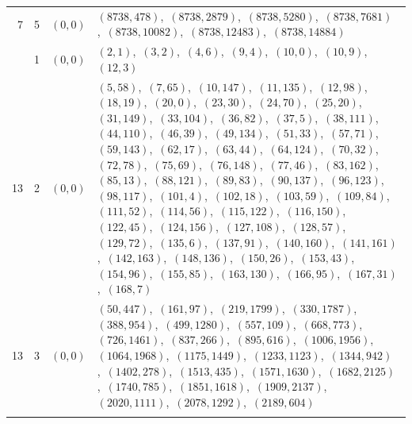\documentclass[11pt]{article}
\begin{document}
\begin{longtable}{@{}rrl>{\raggedright\arraybackslash}p{}@{}}
7 & 5 & $(0,0)$ & $(8738,478)$,\allowbreak\ $(8738,2879)$,\allowbreak\ $(8738,5280)$,\allowbreak\ $(8738,7681)$,\allowbreak\ $(8738,10082)$,\allowbreak\ $(8738,12483)$,\allowbreak\ $(8738,14884)$\\
\addlinespace[3pt]
13 & 1 & $(0,0)$ & $(2,1)$,\allowbreak\ $(3,2)$,\allowbreak\ $(4,6)$,\allowbreak\ $(9,4)$,\allowbreak\ $(10,0)$,\allowbreak\ $(10,9)$,\allowbreak\ $(12,3)$\\
13 & 2 & $(0,0)$ & $(5,58)$,\allowbreak\ $(7,65)$,\allowbreak\ $(10,147)$,\allowbreak\ $(11,135)$,\allowbreak\ $(12,98)$,\allowbreak\ $(18,19)$,\allowbreak\ $(20,0)$,\allowbreak\ $(23,30)$,\allowbreak\ $(24,70)$,\allowbreak\ $(25,20)$,\allowbreak\ $(31,149)$,\allowbreak\ $(33,104)$,\allowbreak\ $(36,82)$,\allowbreak\ $(37,5)$,\allowbreak\ $(38,111)$,\allowbreak\ $(44,110)$,\allowbreak\ $(46,39)$,\allowbreak\ $(49,134)$,\allowbreak\ $(51,33)$,\allowbreak\ $(57,71)$,\allowbreak\ $(59,143)$,\allowbreak\ $(62,17)$,\allowbreak\ $(63,44)$,\allowbreak\ $(64,124)$,\allowbreak\ $(70,32)$,\allowbreak\ $(72,78)$,\allowbreak\ $(75,69)$,\allowbreak\ $(76,148)$,\allowbreak\ $(77,46)$,\allowbreak\ $(83,162)$,\allowbreak\ $(85,13)$,\allowbreak\ $(88,121)$,\allowbreak\ $(89,83)$,\allowbreak\ $(90,137)$,\allowbreak\ $(96,123)$,\allowbreak\ $(98,117)$,\allowbreak\ $(101,4)$,\allowbreak\ $(102,18)$,\allowbreak\ $(103,59)$,\allowbreak\ $(109,84)$,\allowbreak\ $(111,52)$,\allowbreak\ $(114,56)$,\allowbreak\ $(115,122)$,\allowbreak\ $(116,150)$,\allowbreak\ $(122,45)$,\allowbreak\ $(124,156)$,\allowbreak\ $(127,108)$,\allowbreak\ $(128,57)$,\allowbreak\ $(129,72)$,\allowbreak\ $(135,6)$,\allowbreak\ $(137,91)$,\allowbreak\ $(140,160)$,\allowbreak\ $(141,161)$,\allowbreak\ $(142,163)$,\allowbreak\ $(148,136)$,\allowbreak\ $(150,26)$,\allowbreak\ $(153,43)$,\allowbreak\ $(154,96)$,\allowbreak\ $(155,85)$,\allowbreak\ $(163,130)$,\allowbreak\ $(166,95)$,\allowbreak\ $(167,31)$,\allowbreak\ $(168,7)$\\
13 & 3 & $(0,0)$ & $(50,447)$,\allowbreak\ $(161,97)$,\allowbreak\ $(219,1799)$,\allowbreak\ $(330,1787)$,\allowbreak\ $(388,954)$,\allowbreak\ $(499,1280)$,\allowbreak\ $(557,109)$,\allowbreak\ $(668,773)$,\allowbreak\ $(726,1461)$,\allowbreak\ $(837,266)$,\allowbreak\ $(895,616)$,\allowbreak\ $(1006,1956)$,\allowbreak\ $(1064,1968)$,\allowbreak\ $(1175,1449)$,\allowbreak\ $(1233,1123)$,\allowbreak\ $(1344,942)$,\allowbreak\ $(1402,278)$,\allowbreak\ $(1513,435)$,\allowbreak\ $(1571,1630)$,\allowbreak\ $(1682,2125)$,\allowbreak\ $(1740,785)$,\allowbreak\ $(1851,1618)$,\allowbreak\ $(1909,2137)$,\allowbreak\ $(2020,1111)$,\allowbreak\ $(2078,1292)$,\allowbreak\ $(2189,604)$\\
\addlinespace[3pt]
\end{longtable}
\endgroup
\end{document}

